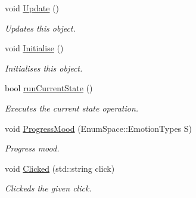 \begin{DoxyCompactItemize}
void \hyperlink{class_n_p_c_af62e98d4bc6e38d355934fe41511d2b4}{Update} ()
\begin{DoxyCompactList}\small\item\em Updates this object. \end{DoxyCompactList}\item 
void \hyperlink{class_n_p_c_a19ffac02c2add2ac1a4a77a0f73bbd2f}{Initialise} ()
\begin{DoxyCompactList}\small\item\em Initialises this object. \end{DoxyCompactList}\item 
bool \hyperlink{class_n_p_c_abc15c4dbd9dea30968cbf01e4e723f65}{run\-Current\-State} ()
\begin{DoxyCompactList}\small\item\em Executes the current state operation. \end{DoxyCompactList}\item 
void \hyperlink{class_n_p_c_afdc85c2f160a4d2ce51afb33385fe425}{Progress\-Mood} (Enum\-Space\-::\-Emotion\-Types S)
\begin{DoxyCompactList}\small\item\em Progress mood. \end{DoxyCompactList}\item 
void \hyperlink{class_n_p_c_ab9c846d51a96ad4eb0cb676bfc35d9bb}{Clicked} (std\-::string click)
\begin{DoxyCompactList}\small\item\em Clickeds the given click. \end{DoxyCompactList}\end{DoxyCompactItemize}

